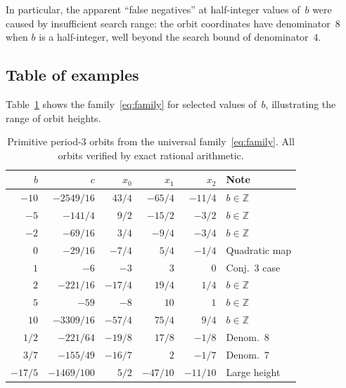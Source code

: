 \documentclass[11pt]{article}
\theoremstyle{definition}
\theoremstyle{remark}
\begin{document}
In particular, the apparent ``false negatives'' at half-integer values of~$b$
were caused by insufficient search range: the orbit coordinates have
denominator~$8$ when $b$ is a half-integer, well beyond the search bound
of denominator~$4$.

\subsection{Table of examples}

Table~\ref{tab:orbits} shows the family~\eqref{eq:family} for selected values
of~$b$, illustrating the range of orbit heights.

\begin{table}[ht]
  \centering
  \caption{Primitive period-$3$ orbits from the universal family~\eqref{eq:family}.
    All orbits verified by exact rational arithmetic.}
  \label{tab:orbits}
  \begin{tabular}{@{} rrrrrl @{}}
    \toprule
    $b$ & $c$ & $x_0$ & $x_1$ & $x_2$ & Note \\
    \midrule
    $-10$ & $-2549/16$ & $43/4$   & $-65/4$ & $-11/4$ & $b \in \mathbb{Z}$ \\
    $-5$  & $-141/4$   & $9/2$    & $-15/2$ & $-3/2$  & $b \in \mathbb{Z}$ \\
    $-2$  & $-69/16$   & $3/4$    & $-9/4$  & $-3/4$  & $b \in \mathbb{Z}$ \\
    $0$   & $-29/16$   & $-7/4$   & $5/4$   & $-1/4$  & Quadratic map \\
    $1$   & $-6$       & $-3$     & $3$     & $0$     & Conj.~3 case \\
    $2$   & $-221/16$  & $-17/4$  & $19/4$  & $1/4$   & $b \in \mathbb{Z}$ \\
    $5$   & $-59$      & $-8$     & $10$    & $1$     & $b \in \mathbb{Z}$ \\
    $10$  & $-3309/16$ & $-57/4$  & $75/4$  & $9/4$   & $b \in \mathbb{Z}$ \\
    \midrule
    $1/2$ & $-221/64$  & $-19/8$  & $17/8$  & $-1/8$  & Denom.~$8$ \\
    $3/7$ & $-155/49$  & $-16/7$  & $2$     & $-1/7$  & Denom.~$7$ \\
    $-17/5$ & $-1469/100$ & $5/2$ & $-47/10$ & $-11/10$ & Large height \\
    \bottomrule
  \end{tabular}
\end{table}
\end{document}
